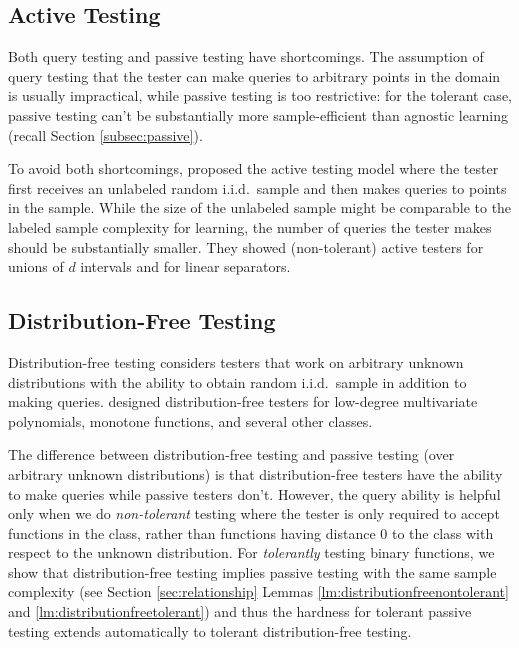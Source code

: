 \subsection{Active Testing}
Both query testing and passive testing have shortcomings. The assumption of query testing that the tester can make queries to arbitrary points in the domain is usually impractical, while passive testing is too restrictive: for the tolerant case, passive testing can't be substantially more sample-efficient than agnostic learning (recall Section \ref{subsec:passive}).

To avoid both shortcomings, \citet{BBBY12} proposed the active testing model where the tester first receives an unlabeled random i.i.d.\ sample and then makes queries to points in the sample. While the size of the unlabeled sample might be comparable to the labeled sample complexity for learning, the number of queries the tester makes should be substantially smaller.
They showed (non-tolerant) active testers for unions of $d$ intervals and for linear separators.
\subsection{Distribution-Free Testing}
\label{subsec:distributionfree}
Distribution-free testing \citep{GGR98} considers testers that work on arbitrary unknown distributions with the ability to obtain random i.i.d.\ sample in addition to making queries. \citet{HK03} designed distribution-free testers for low-degree multivariate polynomials, monotone functions, and several other classes.

The difference between distribution-free testing and passive testing (over arbitrary unknown distributions) is that distribution-free testers have the ability to make queries while passive testers don't. However, the query ability is helpful only when we do \emph{non-tolerant} testing where the tester is only required to accept functions in the class, rather than functions having distance 0 to the class with respect to the unknown distribution. For \emph{tolerantly} testing binary functions, we show that distribution-free testing implies passive testing with the same sample complexity (see Section \ref{sec:relationship} Lemmas \ref{lm:distributionfreenontolerant} and \ref{lm:distributionfreetolerant}) and thus the hardness for tolerant passive testing extends automatically to tolerant distribution-free testing.



